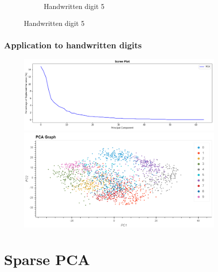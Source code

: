 \documentclass{beamer}
\theoremstyle{plain}
\theoremstyle{definition}
\begin{document}
\begin{frame}
\begin{figure}
\begin{subfigure}{0.45\textwidth}
	\caption{Handwritten digit 5}
	\end{subfigure}
\end{figure}
\end{frame}

\begin{frame}
\frametitle{Application to handwritten digits}
\begin{figure}
\centering
\includegraphics[width = 0.9\textwidth]{figures/pca_handwritten_digits_scree.png}
\includegraphics[width = 0.9\textwidth]{figures/pca_handwritten_digits.png}
\end{figure}
\end{frame}



\section{Sparse PCA}
\end{document}
